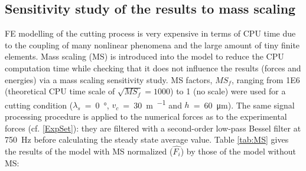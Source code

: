\documentclass[preprint,12pt,times]{elsarticle}
\newcommand{\dnsp}[2]{{#1}_{\!\!#2}}  %
\begin{document}
\subsection{Sensitivity study of the results to mass scaling}

FE modelling of the cutting process is very expensive in terms of CPU time due to the coupling of many nonlinear phenomena and the large amount of tiny finite elements. Mass scaling (MS) is introduced into the model to reduce the CPU computation time while checking that it does not influence the results (forces and energies) via a mass scaling sensitivity study. MS factors, $\dnsp{MS}{f}$, ranging from \num{1E6} (theoretical CPU time scale of $\sqrt{\dnsp{MS}{f}} = \num{1000}$) to 1 (no scale) were used for a cutting condition ($\lambda_s$~=~\qty{0}{\degree}, $v_c$~=~\qty{30}{\m\per\min} and $h$~=~\qty{60}{\um}). The same signal processing procedure is applied to the numerical forces as to the experimental forces (cf. \ref{ExpSet}): they are filtered with a second-order low-pass Bessel filter at \qty{750}{\Hz} before calculating the steady state average value. Table \ref{tab:MS} gives the results of the model with MS normalized ($\hat{F_i}$) by those of the model without MS:
\end{document}
